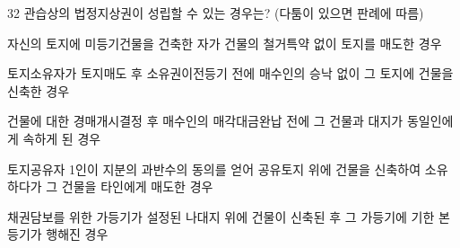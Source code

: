 \begin{question}{32}
관습상의 법정지상권이 성립할 수 있는 경우는? (다툼이 있으면 판례에 따름)
\begin{choices}
  \item 자신의 토지에 미등기건물을 건축한 자가 건물의 철거특약 없이 토지를 매도한 경우
  \item 토지소유자가 토지매도 후 소유권이전등기 전에 매수인의 승낙 없이 그 토지에 건물을 신축한 경우
  \item 건물에 대한 경매개시결정 후 매수인의 매각대금완납 전에 그 건물과 대지가 동일인에게 속하게 된 경우
  \item 토지공유자 1인이 지분의 과반수의 동의를 얻어 공유토지 위에 건물을 신축하여 소유하다가 그 건물을 타인에게 매도한 경우
  \item 채권담보를 위한 가등기가 설정된 나대지 위에 건물이 신축된 후 그 가등기에 기한 본등기가 행해진 경우
\end{choices}
\end{question}

